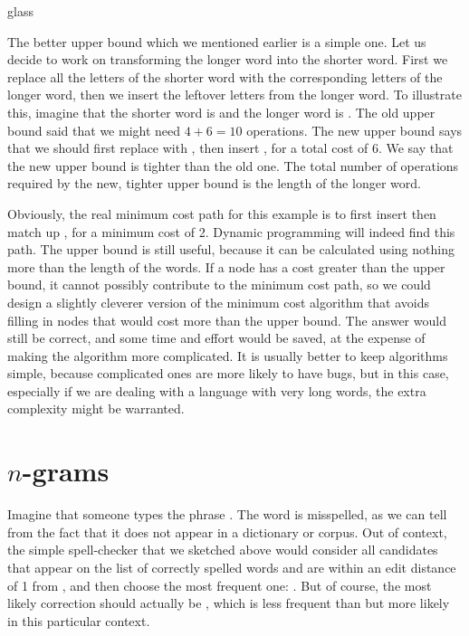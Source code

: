 \begin{tblsfilledsymbol}{}{glass}
\begin{underthehood}
The better upper bound which we mentioned earlier is a simple one.
Let us decide to work on transforming the longer word into the shorter
word.  First we replace all the letters of the shorter word with the
corresponding letters of the longer word, then we insert the leftover
letters from the longer word.  To illustrate this, imagine that the
shorter word is  and the longer word is .
The old upper bound said that we might need \(4 + 6 = 10\) operations.
The new upper bound says that we should first replace 
with , then insert , for a total cost of 6. We
say that the new upper bound is tighter than the old one.  The total
number of operations required by the new, tighter upper bound is the
length of the longer word.

Obviously, the real minimum cost path for this example is to first
insert  then match up , for a minimum cost of
2.  Dynamic programming will indeed find this path.  The upper bound
is still useful, because it can be calculated using nothing more than
the length of the words.  If a node has a cost greater than the upper
bound, it cannot possibly contribute to the minimum cost path, so we
could design a slightly cleverer version of the minimum cost algorithm
that avoids filling in nodes that would cost more than the upper
bound.  The answer would still be correct, and some time and effort
would be saved, at the expense of making the algorithm more
complicated. It is usually better to keep algorithms simple, because
complicated ones are more likely to have bugs, but in this case,
especially if we are dealing with a language with very long words, the
extra complexity might be warranted.

\end{underthehood}
\end{tblsfilledsymbol}

\section{$n$-grams} 

Imagine that someone types the phrase .  The word  is misspelled, as we can tell from the fact that it does not appear in a dictionary or corpus.  Out of context, the simple spell-checker that we sketched above would consider all candidates that appear on the list of correctly spelled words and are within an edit distance of 1 from , and then choose the most frequent one: .  But of course, the most likely correction should actually be , which is less frequent than  but more likely in this particular context.

